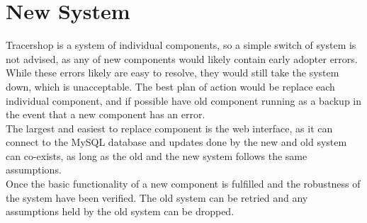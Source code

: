 \documentclass{article}
\begin{document}
\section*{New System}
Tracershop is a system of individual components, so a simple switch of system is not advised, as any of new components would likely contain early adopter errors.
While these errors likely are easy to resolve, they would still take the system down, which is unacceptable.
The best plan of action would be replace each individual component,
and if possible have old component running as a backup in the event that a new component has an error.\\
The largest and easiest to replace component is the web interface, as it can connect to the MySQL database and updates done by the new and old system can co-exists,
as long as the old and the new system follows the same assumptions.\\
Once the basic functionality of a new component is fulfilled and the robustness of the system have been verified. The old system can be retried and
any assumptions held by the old system can be dropped.

\clearpage

\printglossaries
\end{document}
